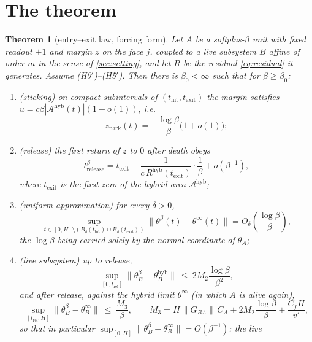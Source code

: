 \documentclass[11pt]{article}
\newtheorem{theorem}{Theorem}
\theoremstyle{definition}
\theoremstyle{remark}
\newcommand{\hyb}{\mathrm{hyb}}
\newcommand{\thit}{t_{\mathrm{hit}}}
\newcommand{\texit}{t_{\mathrm{exit}}}
\newcommand{\trel}{t_{\mathrm{rel}}}
\newcommand{\Ar}{\mathcal{A}}
\begin{document}
\section{The theorem}\label{sec:thm}

\begin{theorem}[entry--exit law, forcing form]\label{thm:forcing}
Let $A$ be a softplus-$\beta$ unit with fixed readout $+1$ and margin $z$ on the
face $j$, coupled to a live subsystem $B$ affine of order $m$ in the sense of
\cref{sec:setting}, and let $R$ be the residual \eqref{eq:residual} it generates.
Assume \textup{(H0$'$)--(H5$'$)}. Then there is $\beta_0<\infty$ such that for
$\beta\ge\beta_0$:
\begin{enumerate}
\item[(i)] \emph{(sticking)} on compact subintervals of $(\thit,\texit)$ the
margin satisfies $u=c\beta|\Ar^{\hyb}(t)|(1+o(1))$, i.e.
\[
z_{\mathrm{park}}(t)=-\frac{\log\beta}{\beta}\bigl(1+o(1)\bigr);
\]
\item[(ii)] \emph{(release)} the first return of $z$ to $0$ after death obeys
\begin{equation}\label{eq:release}
t^\beta_{\mathrm{release}}
=\texit-\frac{1}{c\,R^{\hyb}(\texit)}\cdot\frac1\beta+o(\beta^{-1}),
\end{equation}
where $\texit$ is the first zero of the hybrid area $\Ar^{\hyb}$;
\item[(iii)] \emph{(uniform approximation)} for every $\delta>0$,
\begin{equation}\label{eq:sup}
\sup_{t\in[0,H]\setminus(B_\delta(\thit)\cup B_\delta(\texit))}
\bigl\|\theta^\beta(t)-\theta^\infty(t)\bigr\|=O_\delta\!\left(\frac{\log\beta}{\beta}\right),
\end{equation}
the $\log\beta$ being carried solely by the normal coordinate of $\theta_A$;
\item[(iv)] \emph{(live subsystem)} up to release,
\begin{equation}\label{eq:ivA}
\sup_{[0,\trel]}\bigl\|\theta_B^\beta-\theta_B^{\hyb}\bigr\|
\ \le\ 2M_2\frac{\log\beta}{\beta^2},
\end{equation}
and after release, against the hybrid limit $\theta^\infty$ (in which $A$ is
alive again),
\begin{equation}\label{eq:ivB}
\sup_{[\trel,H]}\bigl\|\theta_B^\beta-\theta_B^{\infty}\bigr\|
\ \le\ \frac{M_3}{\beta},
\qquad
M_3=H\,\|G_{BA}\|\,C_A+2M_2\frac{\log\beta}{\beta}+\frac{C_fH}{v'} ,
\end{equation}
so that in particular
$\sup_{[0,H]}\|\theta_B^\beta-\theta_B^{\infty}\|=O(\beta^{-1})$: the live

\end{enumerate}
\end{theorem}
\end{document}
